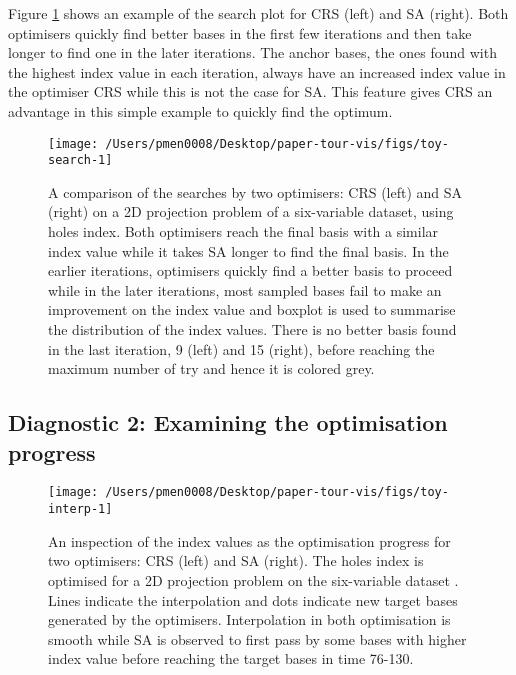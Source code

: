 Figure \ref{fig:toy-search} shows an example of the search plot for CRS
(left) and SA (right). Both optimisers quickly find better bases in the
first few iterations and then take longer to find one in the later
iterations. The anchor bases, the ones found with the highest index
value in each iteration, always have an increased index value in the
optimiser CRS while this is not the case for SA. This feature gives CRS
an advantage in this simple example to quickly find the optimum.

\begin{Schunk}
\begin{figure}

{\centering \texttt{[image: /Users/pmen0008/Desktop/paper-tour-vis/figs/toy-search-1]} 

}

\caption[A comparison of the searches by two optimisers]{A comparison of the searches by two optimisers: CRS (left) and SA (right) on a 2D projection problem of a six-variable dataset,  using holes index. Both optimisers reach the final basis with a similar index value while it takes SA longer to find the final basis. In the earlier iterations, optimisers quickly find a better basis to proceed while in the later iterations, most sampled bases fail to make an improvement on the index value and boxplot is used to summarise the distribution of the index values. There is no better basis found in the last iteration, 9 (left) and 15 (right), before reaching the maximum number of try and hence it is colored grey.}\label{fig:toy-search}
\end{figure}
\end{Schunk}

\hypertarget{toy-interp}{%
\subsection{Diagnostic 2: Examining the optimisation
progress}\label{toy-interp}}

\begin{Schunk}
\begin{figure}

{\centering \texttt{[image: /Users/pmen0008/Desktop/paper-tour-vis/figs/toy-interp-1]} 

}

\caption[An inspection of the index values as the optimisation progress for two optimisers]{An inspection of the index values as the optimisation progress for two optimisers: CRS (left) and SA (right). The holes index is optimised for a 2D projection problem on the six-variable dataset . Lines indicate the interpolation and dots indicate new target bases generated by the optimisers. Interpolation in both optimisation is smooth while SA is observed to first pass by some bases with higher index value before reaching the target bases in time 76-130.}\label{fig:toy-interp}
\end{figure}
\end{Schunk}

